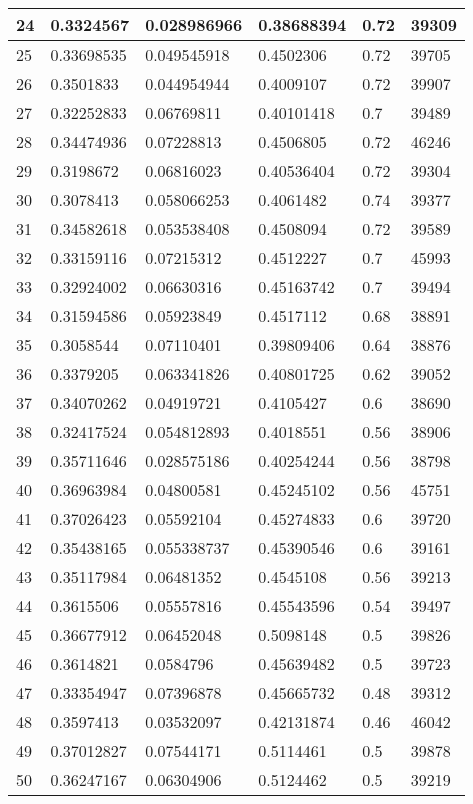 \begin{longtable}{|l|l|l|l|l|l|}
24 & 0.3324567 & 0.028986966 & 0.38688394 & 0.72 & 39309 \\ \hline 
25 & 0.33698535 & 0.049545918 & 0.4502306 & 0.72 & 39705 \\ \hline 
26 & 0.3501833 & 0.044954944 & 0.4009107 & 0.72 & 39907 \\ \hline 
27 & 0.32252833 & 0.06769811 & 0.40101418 & 0.7 & 39489 \\ \hline 
28 & 0.34474936 & 0.07228813 & 0.4506805 & 0.72 & 46246 \\ \hline 
29 & 0.3198672 & 0.06816023 & 0.40536404 & 0.72 & 39304 \\ \hline 
30 & 0.3078413 & 0.058066253 & 0.4061482 & 0.74 & 39377 \\ \hline 
31 & 0.34582618 & 0.053538408 & 0.4508094 & 0.72 & 39589 \\ \hline 
32 & 0.33159116 & 0.07215312 & 0.4512227 & 0.7 & 45993 \\ \hline 
33 & 0.32924002 & 0.06630316 & 0.45163742 & 0.7 & 39494 \\ \hline 
34 & 0.31594586 & 0.05923849 & 0.4517112 & 0.68 & 38891 \\ \hline 
35 & 0.3058544 & 0.07110401 & 0.39809406 & 0.64 & 38876 \\ \hline 
36 & 0.3379205 & 0.063341826 & 0.40801725 & 0.62 & 39052 \\ \hline 
37 & 0.34070262 & 0.04919721 & 0.4105427 & 0.6 & 38690 \\ \hline 
38 & 0.32417524 & 0.054812893 & 0.4018551 & 0.56 & 38906 \\ \hline 
39 & 0.35711646 & 0.028575186 & 0.40254244 & 0.56 & 38798 \\ \hline 
40 & 0.36963984 & 0.04800581 & 0.45245102 & 0.56 & 45751 \\ \hline 
41 & 0.37026423 & 0.05592104 & 0.45274833 & 0.6 & 39720 \\ \hline 
42 & 0.35438165 & 0.055338737 & 0.45390546 & 0.6 & 39161 \\ \hline 
43 & 0.35117984 & 0.06481352 & 0.4545108 & 0.56 & 39213 \\ \hline 
44 & 0.3615506 & 0.05557816 & 0.45543596 & 0.54 & 39497 \\ \hline 
45 & 0.36677912 & 0.06452048 & 0.5098148 & 0.5 & 39826 \\ \hline 
46 & 0.3614821 & 0.0584796 & 0.45639482 & 0.5 & 39723 \\ \hline 
47 & 0.33354947 & 0.07396878 & 0.45665732 & 0.48 & 39312 \\ \hline 
48 & 0.3597413 & 0.03532097 & 0.42131874 & 0.46 & 46042 \\ \hline 
49 & 0.37012827 & 0.07544171 & 0.5114461 & 0.5 & 39878 \\ \hline 
50 & 0.36247167 & 0.06304906 & 0.5124462 & 0.5 & 39219 \\ \hline 
\end{longtable}